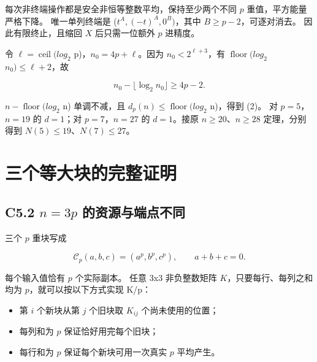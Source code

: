\documentclass[11pt,a4paper]{article}
\newcommand{\tightlist}{\setlength{\itemsep}{0pt}\setlength{\parskip}{0pt}}
\theoremstyle{definition}
\numberwithin{equation}{section}
\begin{document}
{每次非终端操作都是安全非恒等整数平均，保持至少两个不同} {\ensuremath{p}} {重值，平方能量严格下降。} {唯一单列终端是} {(\ensuremath{t^A,(-t)^A,0^B)}，其中} {\ensuremath{B\ge p-2}，可逐对消去。} {因此有限终止，且缩回} {\ensuremath{X}} {后只需一位额外} {\ensuremath{p}} {进精度。}

{令} {\ensuremath{\ell =\operatorname{ceil}(log_{2}}} {p)，\ensuremath{n_{0}=4p+\ell }。因为} {\ensuremath{n_{0}<2^{\ell +3}}，有} {\ensuremath{\operatorname{floor}(log_{2}}} {\ensuremath{n_{0})\le \ell +2}，故}

\[
n_0-\lfloor\log_2 n_0\rfloor\ge4p-2.
\]

{\ensuremath{n-\operatorname{floor}(log_{2}}} {n)} {单调不减，且} {\ensuremath{d_{p}(n)\le \operatorname{floor}(log_{2}}} {n)，得到} {(2)。} {对} {\ensuremath{p=5}，\ensuremath{n=19}} {的} {\ensuremath{d=1}；对} {\ensuremath{p=7}，\ensuremath{n=27}} {的} {\ensuremath{d=1}。接原} {\ensuremath{n\ge 20}、\ensuremath{n\ge 28}} {定理，分别得到} {\ensuremath{N(5)\le 19}、\ensuremath{N(7)\le 27}。}


\section{三个等大块的完整证明}\label{construct:three-blocks}
\subsection*{\texorpdfstring{{C5.2} {\ensuremath{n=3p}} {的资源与端点不同}}{C5.2  的资源与端点不同}}\label{C5-h28}

{三个} {\ensuremath{p}} {重块写成}

\[
\mathcal C_p(a,b,c)=(a^p,b^p,c^p),\qquad a+b+c=0.
\]

{每个输入值恰有} {\ensuremath{p}} {个实际副本。} {任意} {3x3} {非负整数矩阵} {\ensuremath{K}，只要每行、每列之和均为} {\ensuremath{p}，就可以按以下方式实现} {K/p：}

\begin{itemize}
\tightlist
\item
  {第} {\ensuremath{i}} {个新块从第} {\ensuremath{j}} {个旧块取} {\ensuremath{K_{ij}}} {个尚未使用的位置；}
\item
  {每列和为} {\ensuremath{p}} {保证恰好用完每个旧块；}
\item
  {每行和为} {\ensuremath{p}} {保证每个新块可用一次真实} {\ensuremath{p}} {平均产生。}
\end{itemize}
\end{document}
